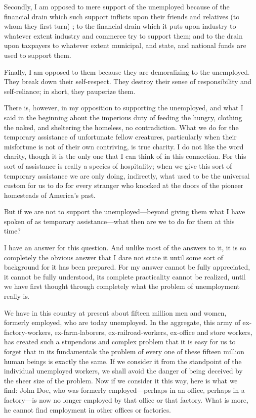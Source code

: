 \documentclass{book}
\begin{document}
Secondly, I am opposed to mere support of the unemployed because of the financial drain which such support inflicts upon their friends and relatives (to whom they first turn) ; to the financial drain which it puts upon industry to whatever extent industry and commerce try to support them; and to the drain upon taxpayers to whatever extent municipal, and state, and national funds are used to support them.

Finally, I am opposed to them because they are demoralizing to the unemployed. They break down their self-respect. They destroy their sense of responsibility and self-reliance; in short, they pauperize them.

There is, however, in my opposition to supporting the unemployed, and what I said in the beginning about the imperious duty of feeding the hungry, clothing the naked, and sheltering the homeless, no contradiction. What we do for the temporary assistance of unfortunate fellow creatures, particularly when their misfortune is not of their own contriving, is true charity. I do not like the word charity, though it is the only one that I can think of in this connection. For this sort of assistance is really a species of hospitality; when we give this sort of temporary assistance we are only doing, indirectly, what used to be the universal custom for us to do for every stranger who knocked at the doors of the pioneer homesteads of America’s past.

But if we are not to support the unemployed—beyond giving them what I have spoken of as temporary assistance—what then are we to do for them at this time?

I have an answer for this question. And unlike most of the answers to it, it is so completely the obvious answer that I dare not state it until some sort of background for it has been prepared. For my answer cannot be fully appreciated, it cannot be fully understood, its complete practicality cannot be realized, until we have first thought through completely what the problem of unemployment really is.

We have in this country at present about fifteen million men and women, formerly employed, who are today unemployed. In the aggregate, this army of ex-factory-workers, ex-farm-laborers, ex-railroad-workers, ex-office and store workers, has created such a stupendous and complex problem that it is easy for us to forget that in its fundamentals the problem of every one of these fifteen million human beings is exactly the same. If we consider it from the standpoint of the individual unemployed workers, we shall avoid the danger of being deceived by the sheer size of the problem. Now if we consider it this way, here is what we find: John Doe, who was formerly employed—perhaps in an office, perhaps in a factory—is now no longer employed by that office or that factory. What is more, he cannot find employment in other offices or factories.
\end{document}
